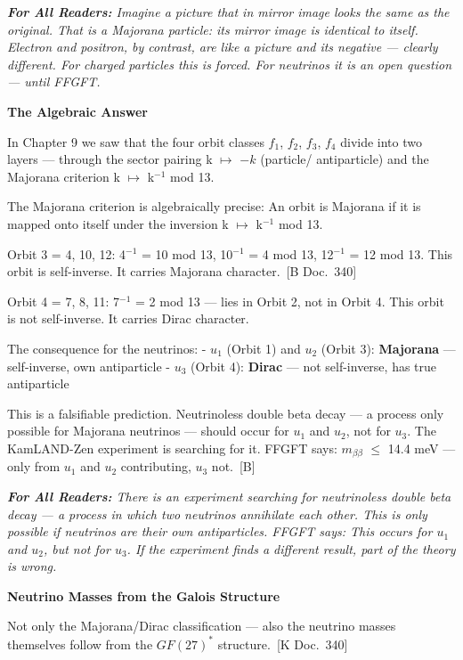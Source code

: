 \documentclass[11pt,oneside]{book}
\newcommand{\status}[1]{\penalty10000\,{\scriptsize\textcolor{gray!60}{[#1]}}}
\newenvironment{laierspur}{%
  \par\vspace{4pt}%
  \noindent\small\itshape\color{blue!60!black}%
  \textbf{For All Readers:}\enspace\ignorespaces}{%
  \par\vspace{4pt}\normalsize\normalfont\normalcolor}
\begin{document}
\begin{laierspur}
Imagine a picture that in mirror image looks the same as the original.
That is a Majorana particle: its mirror image is identical to itself.
Electron and positron, by contrast, are like a picture and its negative —
clearly different. For charged particles this is forced. For neutrinos it is
an open question — until FFGFT.
\end{laierspur}

\textbf{The Algebraic Answer}

In Chapter 9 we saw that the four orbit classes {$f_1$, $f_2$, $f_3$, $f_4$} divide
into two layers — through the sector pairing k $\mapsto$ $-k$ (particle/
antiparticle) and the Majorana criterion k $\mapsto$ k$^{-1}$ mod 13.

The Majorana criterion is algebraically precise: An orbit is Majorana if it
is mapped onto itself under the inversion k $\mapsto$ k$^{-1}$ mod 13.

Orbit 3 = {4, 10, 12}: 4$^{-1}$ = 10 mod 13, 10$^{-1}$ = 4 mod 13, 12$^{-1}$ = 12 mod 13.
This orbit is self-inverse. It carries Majorana character. \status{B Doc.~340}

Orbit 4 = {7, 8, 11}: 7$^{-1}$ = 2 mod 13 — lies in Orbit 2, not in Orbit 4.
This orbit is not self-inverse. It carries Dirac character.

The consequence for the neutrinos:
- $
u_1$ (Orbit 1) and $
u_2$ (Orbit 3): \textbf{Majorana} — self-inverse, own antiparticle
- $
u_3$ (Orbit 4): \textbf{Dirac} — not self-inverse, has true antiparticle

This is a falsifiable prediction. Neutrinoless double beta decay — a process
only possible for Majorana neutrinos — should occur for $
u_1$ and $
u_2$, not
for $
u_3$. The KamLAND-Zen experiment is searching for it. FFGFT says:
$m_{\beta\beta}$ $\leq$ 14.4 meV — only from $
u_1$ and $
u_2$ contributing, $
u_3$ not. \status{B}

\begin{laierspur}
There is an experiment searching for neutrinoless double beta decay — a
process in which two neutrinos annihilate each other. This is only possible
if neutrinos are their own antiparticles. FFGFT says: This occurs for $
u_1$
and $
u_2$, but not for $
u_3$. If the experiment finds a different result, part
of the theory is wrong.
\end{laierspur}

\textbf{Neutrino Masses from the Galois Structure}

Not only the Majorana/Dirac classification — also the neutrino masses
themselves follow from the $GF(27)^*$ structure. \status{K Doc.~340}
\end{document}
